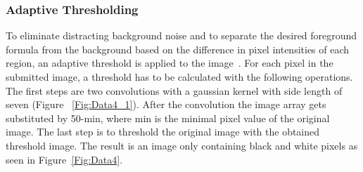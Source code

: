 \documentclass[@CLASSOPTIONS@]{tumarticle}
\begin{document}
\subsubsection{Adaptive Thresholding}

To eliminate distracting background noise and to separate the desired foreground formula
from the background based on the difference in pixel intensities of each region,
an adaptive threshold is applied to the image~\cite{threshold}.
For each pixel in the submitted image, a threshold has to be calculated with the following operations.
The first steps are two convolutions with a gaussian kernel with side length of seven (Figure ~\ref{Fig:Data4_1}).
After the convolution the image array gets substituted by 50-min, where min is the
minimal pixel value of the original image.
The last step is to threshold the original image with the obtained threshold image.
The result is an image only containing black and white pixels as seen in Figure~\ref{Fig:Data4}.
\end{document}
